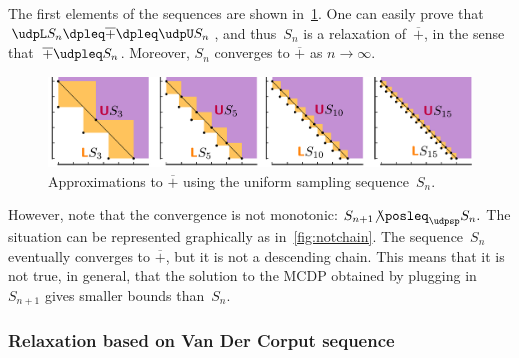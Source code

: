 The first elements of the sequences are shown in~\cref{fig:approx_invplus}.
One can easily prove that $\udpL S_{n}\dpleq\overline{+}\dpleq\udpU S_{n}$,
and thus~$S_{n}$ is a relaxation of~$\overline{+}$, in the sense
that~$\overline{+}\udpleq S_{n}$. Moreover, $S_{n}$ converges to
$\overline{+}$ as $n\rightarrow\infty$.
\begin{center}
    \begin{figure}[h]
        \centering{}\includegraphics[scale=0.33]{unc_sampling}\caption{\label{fig:approx_invplus}Approximations to $\overline{+}$ using
        the uniform sampling sequence~$S_{n}$. }
    \end{figure}
    \par
\end{center}

However, note that the convergence is not monotonic: $S_{n+1}{\not\posleq}_{\udpsp}S_{n}.$
The situation can be represented graphically as in~\cref{fig:notchain}.
The sequence~$S_{n}$ eventually converges to $\overline{+}$, but
it is not a descending chain. This means that it is not true, in general,
that the solution to the MCDP obtained by plugging in~$S_{n+1}$
gives smaller bounds than~$S_{n}$.

\subsubsection*{Relaxation based on Van Der Corput sequence}

